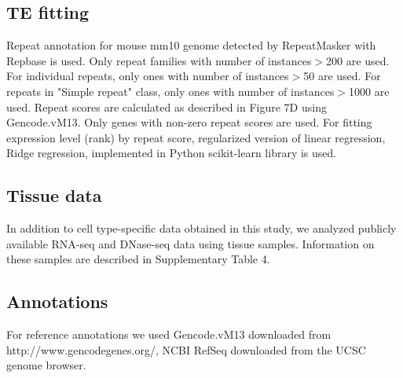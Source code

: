 \subsection{TE fitting}
Repeat annotation for mouse mm10 genome detected by RepeatMasker \citep{repeatmasker} with Repbase \citep[ver. 20140131][]{Bao_2015} is used. Only repeat families with number of instances$>$200 are used. For individual repeats, only ones with number of instances$>$50 are used. For repeats in "Simple repeat" class, only ones with number of instances$>$1000 are used. Repeat scores are calculated as described in Figure 7D using Gencode.vM13. Only genes with non-zero repeat scores are used. For fitting expression level (rank) by repeat score, regularized version of linear regression, Ridge regression, implemented in Python scikit-learn library \citep{scikit-learn} is used.

\subsection{Tissue data}
In addition to cell type-specific data obtained in this study, we analyzed publicly available RNA-seq and DNase-seq data using tissue samples. Information on these samples are described in Supplementary Table 4.

\subsection{Annotations}
For reference annotations we used Gencode.vM13 \citep{Harrow_2012} downloaded from http://www.gencodegenes.org/, NCBI RefSeq \citep{Pruitt_2013} downloaded from the UCSC genome browser.

